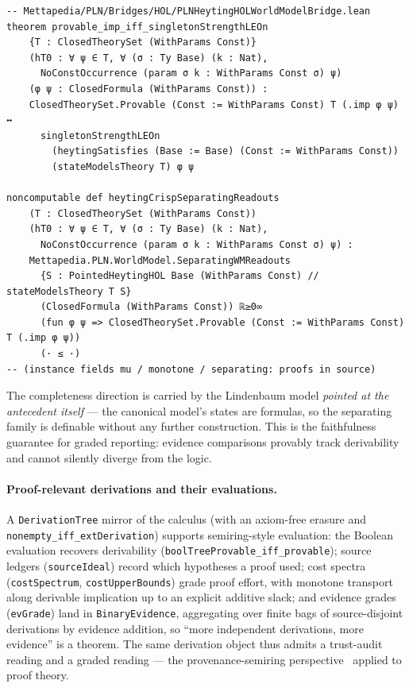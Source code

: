 \documentclass[11pt]{article}
\newcommand{\code}[1]{\texttt{#1}}
\newcommand{\BE}{\code{BinaryEvidence}}
\theoremstyle{plain}
\theoremstyle{definition}
\begin{document}
\begin{lstlisting}
-- Mettapedia/PLN/Bridges/HOL/PLNHeytingHOLWorldModelBridge.lean
theorem provable_imp_iff_singletonStrengthLEOn
    {T : ClosedTheorySet (WithParams Const)}
    (hT0 : ∀ ψ ∈ T, ∀ (σ : Ty Base) (k : Nat),
      NoConstOccurrence (param σ k : WithParams Const σ) ψ)
    (φ ψ : ClosedFormula (WithParams Const)) :
    ClosedTheorySet.Provable (Const := WithParams Const) T (.imp φ ψ) ↔
      singletonStrengthLEOn
        (heytingSatisfies (Base := Base) (Const := WithParams Const))
        (stateModelsTheory T) φ ψ

noncomputable def heytingCrispSeparatingReadouts
    (T : ClosedTheorySet (WithParams Const))
    (hT0 : ∀ ψ ∈ T, ∀ (σ : Ty Base) (k : Nat),
      NoConstOccurrence (param σ k : WithParams Const σ) ψ) :
    Mettapedia.PLN.WorldModel.SeparatingWMReadouts
      {S : PointedHeytingHOL Base (WithParams Const) // stateModelsTheory T S}
      (ClosedFormula (WithParams Const)) ℝ≥0∞
      (fun φ ψ => ClosedTheorySet.Provable (Const := WithParams Const) T (.imp φ ψ))
      (· ≤ ·)
-- (instance fields mu / monotone / separating: proofs in source)
\end{lstlisting}

The completeness direction is carried by the Lindenbaum model \emph{pointed
at the antecedent itself} --- the canonical model's states are formulas, so
the separating family is definable without any further construction.  This
is the faithfulness guarantee for graded reporting: evidence comparisons
provably track derivability and cannot silently diverge from the logic.

\paragraph{Proof-relevant derivations and their evaluations.}  A
\code{DerivationTree} mirror of the calculus (with an axiom-free erasure and
\code{nonempty\_iff\_extDerivation}) supports semiring-style evaluation: the
Boolean evaluation recovers derivability
(\code{boolTreeProvable\_iff\_provable}); source ledgers
(\code{sourceIdeal}) record which hypotheses a proof used; cost spectra
(\code{costSpectrum}, \code{costUpperBounds}) grade proof effort, with
monotone transport along derivable implication up to an explicit additive
slack; and evidence grades (\code{evGrade}) land in \BE{}, aggregating over
finite bags of source-disjoint derivations by evidence addition, so ``more
independent derivations, more evidence'' is a theorem.  The same derivation
object thus admits a trust-audit reading and a graded reading --- the
provenance-semiring perspective~\cite{provenance} applied to proof theory.
\end{document}
